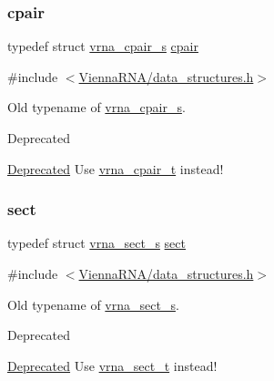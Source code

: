 \subsubsection{\texorpdfstring{cpair}{cpair}}
{\footnotesize\ttfamily typedef struct \hyperlink{group__data__structures_structvrna__cpair__s}{vrna\+\_\+cpair\+\_\+s} \hyperlink{group__data__structures_ga8412f116a2eb07b59ade9e14ca7c5ef1}{cpair}}



{\ttfamily \#include $<$\hyperlink{data__structures_8h}{Vienna\+R\+N\+A/data\+\_\+structures.\+h}$>$}



Old typename of \hyperlink{group__data__structures_structvrna__cpair__s}{vrna\+\_\+cpair\+\_\+s}. 

\begin{DoxyRefDesc}{Deprecated}
\item[\hyperlink{deprecated__deprecated000049}{Deprecated}]Use \hyperlink{group__data__structures_gae4fc91141cc69c6d8eaf1332cb991ecc}{vrna\+\_\+cpair\+\_\+t} instead! \end{DoxyRefDesc}
\mbox{\label{group__data__structures_gaaacedee1f05d3d45aa6764eca51a8876}} 
\subsubsection{\texorpdfstring{sect}{sect}}
{\footnotesize\ttfamily typedef struct \hyperlink{group__data__structures_structvrna__sect__s}{vrna\+\_\+sect\+\_\+s} \hyperlink{group__data__structures_gaaacedee1f05d3d45aa6764eca51a8876}{sect}}



{\ttfamily \#include $<$\hyperlink{data__structures_8h}{Vienna\+R\+N\+A/data\+\_\+structures.\+h}$>$}



Old typename of \hyperlink{group__data__structures_structvrna__sect__s}{vrna\+\_\+sect\+\_\+s}. 

\begin{DoxyRefDesc}{Deprecated}
\item[\hyperlink{deprecated__deprecated000050}{Deprecated}]Use \hyperlink{group__data__structures_gacc9cdae790dac75a7024e7069c0d4400}{vrna\+\_\+sect\+\_\+t} instead! \end{DoxyRefDesc}
\mbox{\label{group__data__structures_gaaeed53a7508c6ce549a98223e94b25df}} 

